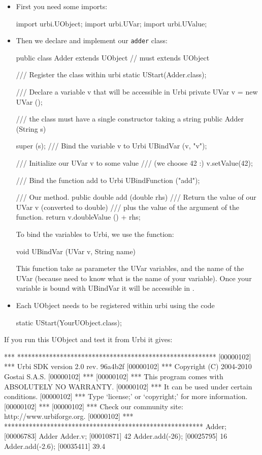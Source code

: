 \begin{itemize}
\item First you need some imports:

\begin{java}
import urbi.UObject;
import urbi.UVar;
import urbi.UValue;
\end{java}

\item Then we declare and implement our \lstinline{adder} class:
\begin{java}
public class Adder extends UObject // must extends UObject
{
  /// Register the class within urbi
  static { UStart(Adder.class); }

  /// Declare a variable v that will be accessible in Urbi
  private UVar v = new UVar ();

  /// the class must have a single constructor taking a string
  public Adder (String s)
  {
    super (s);
    /// Bind the variable v to Urbi
    UBindVar (v, "v");

    /// Initialize our UVar v to some value
    /// (we choose 42 :)
    v.setValue(42);

    /// Bind the function add to Urbi
    UBindFunction ("add");
  }

  /// Our method.
  public double add (double rhs)
  {
    /// Return the value of our UVar v (converted to double)
    /// plus the value of the argument of the function.
    return v.doubleValue () + rhs;
  }
}
\end{java}

To bind the variables to Urbi, we use the function:
\begin{java}
void UBindVar (UVar v, String name)
\end{java}

This function take as parameter the UVar variables, and the name of the
UVar (because \urbi need to know what is the name of your variable).
Once your variable is bound with UBindVar it will be accessible in \urbi.

\item Each UObject needs to be registered within urbi using the code
\begin{java}
static { UStart(YourUObject.class); }
\end{java}
\end{itemize}

If you run this UObject and test it from Urbi it gives:

\begin{urbiunchecked}
[00000102] *** ********************************************************
[00000102] *** Urbi SDK version 2.0 rev. 96a4b2f
[00000102] *** Copyright (C) 2004-2010 Gostai S.A.S.
[00000102] ***
[00000102] *** This program comes with ABSOLUTELY NO WARRANTY.
[00000102] *** It can be used under certain conditions.
[00000102] *** Type `license;' or `copyright;' for more information.
[00000102] ***
[00000102] *** Check our community site: http://www.urbiforge.org.
[00000102] *** ********************************************************
Adder;
[00006783] Adder
Adder.v;
[00010871] 42
Adder.add(-26);
[00025795] 16
Adder.add(-2.6);
[00035411] 39.4
\end{urbiunchecked}

